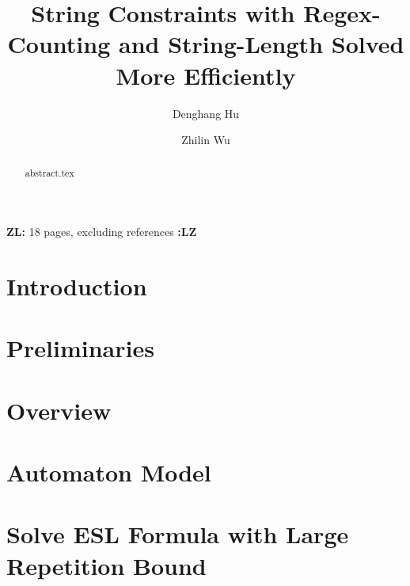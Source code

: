 \documentclass[runningheads]{llncs}
\newcommand{\zhilin}[1]{\color{orange}\textbf{ZL:} #1 \textbf{:LZ}\color{black}}
\begin{document}
\title{String Constraints with Regex-Counting and String-Length Solved More Efficiently}

\author{Denghang Hu \and
  Zhilin Wu}


\maketitle

\begin{abstract}
{abstract.tex}
\end{abstract}

\zhilin{18 pages, excluding references}

\section{Introduction} \label{sec:intro}


\section{Preliminaries} \label{sec:pre}


\section{Overview} \label{sec:overview}


\section{Automaton Model} \label{sec:automaton}


\section{Solve ESL Formula with Large Repetition Bound} \label{sec:algorithm}

\end{document}
